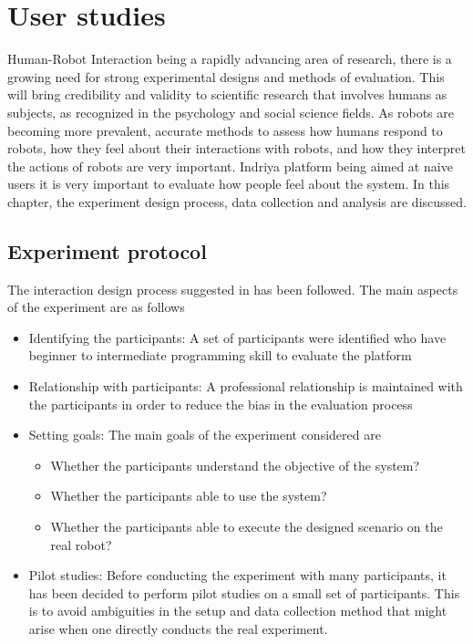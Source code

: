 
\chapter{User studies} %

\label{Chapter6} %

Human-Robot Interaction being a rapidly advancing area of research, there is a growing need for strong experimental designs and methods of evaluation. This will bring credibility and validity to scientific research that involves humans as subjects, as recognized in the psychology and social science fields. As robots are becoming more prevalent, accurate methods to assess how humans respond to robots, how they feel about their interactions with robots, and how they interpret the actions of robots are very important. Indriya platform being aimed at naive users it is very important to evaluate how people feel about the system. In this chapter, the experiment design process, data collection and analysis are discussed.

\section{Experiment protocol}
The interaction design process suggested in \cite{Rogers2011} has been followed. The main aspects of the experiment are as follows
\begin{itemize}
\item Identifying the participants: A set of participants were identified who have beginner to intermediate programming skill to evaluate the platform
\item Relationship with participants: A professional relationship is maintained with the participants in order to reduce the bias in the evaluation process
\item Setting goals: The main goals of the experiment considered are
\begin{itemize}
\item Whether the participants understand the objective of the system?
\item Whether the participants able to use the system?
\item Whether the participants able to execute the designed scenario on the real robot?
\end{itemize}
\item Pilot studies: Before conducting the experiment with many participants, it has been decided to perform pilot studies on a small set of participants. This is to avoid ambiguities in the setup and data collection method that might arise when one directly conducts the real experiment.
\end{itemize}


